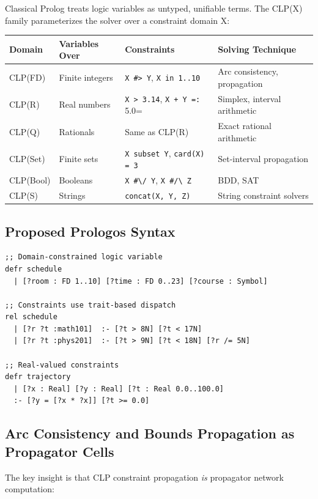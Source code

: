 \documentclass[11pt]{article}
\begin{document}
Classical Prolog treats logic variables as untyped, unifiable terms. The CLP(X)
family parameterizes the solver over a constraint domain X:

\begin{center}
\begin{tabular}{llll}
Domain & Variables Over & Constraints & Solving Technique\\
\hline
CLP(FD) & Finite integers & \texttt{X \#> Y}, \texttt{X in 1..10} & Arc consistency, propagation\\
CLP(R) & Real numbers & \texttt{X > 3.14}, \texttt{X + Y =:} 5.0= & Simplex, interval arithmetic\\
CLP(Q) & Rationals & Same as CLP(R) & Exact rational arithmetic\\
CLP(Set) & Finite sets & \texttt{X subset Y}, \texttt{card(X) = 3} & Set-interval propagation\\
CLP(Bool) & Booleans & \texttt{X \#\textbackslash{}/ Y}, \texttt{X \#/\textbackslash{} Z} & BDD, SAT\\
CLP(S) & Strings & \texttt{concat(X, Y, Z)} & String constraint solvers\\
\end{tabular}
\end{center}
\subsection{Proposed Prologos Syntax}
\label{sec:org2147629}

\begin{verbatim}
;; Domain-constrained logic variable
defr schedule
  | [?room : FD 1..10] [?time : FD 0..23] [?course : Symbol]

;; Constraints use trait-based dispatch
rel schedule
  | [?r ?t :math101]  :- [?t > 8N] [?t < 17N]
  | [?r ?t :phys201]  :- [?t > 9N] [?t < 18N] [?r /= 5N]

;; Real-valued constraints
defr trajectory
  | [?x : Real] [?y : Real] [?t : Real 0.0..100.0]
  :- [?y = [?x * ?x]] [?t >= 0.0]
\end{verbatim}
\subsection{Arc Consistency and Bounds Propagation as Propagator Cells}
\label{sec:org92cc26b}

The key insight is that CLP constraint propagation \emph{is} propagator network
computation:
\end{document}
